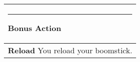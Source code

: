 \documentclass[twocolumn]{article}
\begin{document}
\\
\noindent\begin{tabular}{|m{3.1in}|}
\hline
\rule{1.25in}{0pt}Bonus Action\\
\hline
\textbf{Reload} You reload your boomstick. \\
\hline
\end{tabular}
\end{document}
